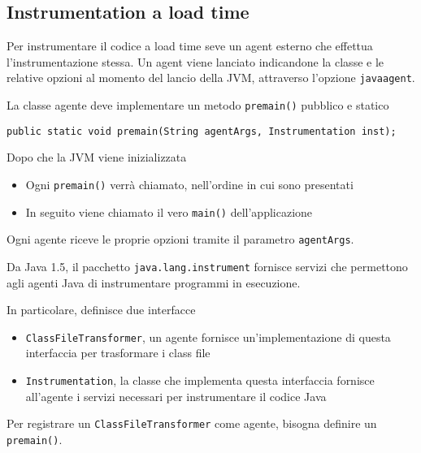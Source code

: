 \subsection{Instrumentation a load time}

Per instrumentare il codice a load time seve un agent esterno che effettua l'instrumentazione stessa. Un agent viene lanciato indicandone la classe e le relative opzioni al momento del lancio della JVM, attraverso l'opzione \texttt{javaagent}.

La classe agente deve implementare un metodo \texttt{premain()} pubblico e statico
\begin{verbatim}
public static void premain(String agentArgs, Instrumentation inst);
\end{verbatim}

Dopo che la JVM viene inizializzata
\begin{itemize}
    \item Ogni \texttt{premain()} verrà chiamato, nell'ordine in cui sono presentati

    \item In seguito viene chiamato il vero \texttt{main()} dell'applicazione
\end{itemize}

Ogni agente riceve le proprie opzioni tramite il parametro \texttt{agentArgs}.

Da Java 1.5, il pacchetto \texttt{java.lang.instrument} fornisce servizi che permettono agli agenti Java di instrumentare programmi in esecuzione.

In particolare, definisce due interfacce
\begin{itemize}
    \item \texttt{ClassFileTransformer}, un agente fornisce un'implementazione di questa interfaccia per trasformare i class file

    \item \texttt{Instrumentation}, la classe che implementa questa interfaccia fornisce all'agente i servizi necessari per instrumentare il codice Java
\end{itemize}

Per registrare un \texttt{ClassFileTransformer} come agente, bisogna definire un \texttt{premain()}.

